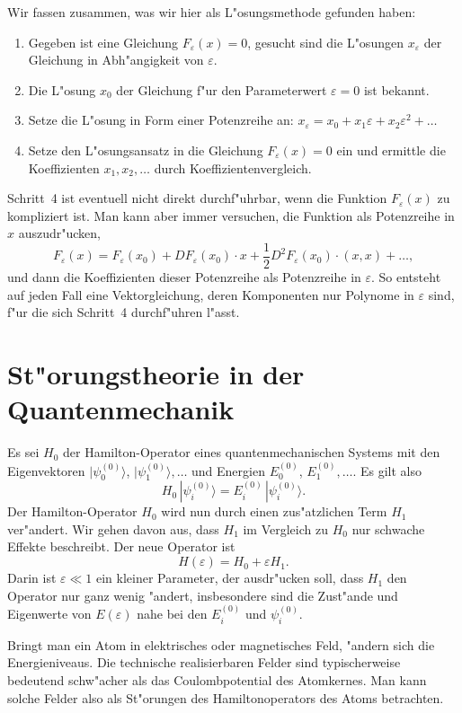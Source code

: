 Wir fassen zusammen, was wir hier als L"osungsmethode gefunden haben:
\begin{enumerate}
\item Gegeben ist eine Gleichung $F_\varepsilon(x)=0$, gesucht
sind die L"osungen $x_\varepsilon$ der Gleichung in Abh"angigkeit von
$\varepsilon$.
\item Die L"osung $x_0$ der Gleichung f"ur den Parameterwert $\varepsilon=0$
ist bekannt.
\item Setze die L"osung in Form einer Potenzreihe an:
$x_\varepsilon = x_0+x_1\varepsilon+x_2\varepsilon^2+\dots$
\item Setze den L"osungsansatz in die Gleichung $F_\varepsilon(x)=0$ ein
und ermittle die Koeffizienten $x_1,x_2,\dots$ durch Koeffizientenvergleich.
\end{enumerate}
Schritt~4 ist eventuell nicht direkt durchf"uhrbar, wenn die Funktion
$F_\varepsilon(x)$ zu kompliziert ist. Man kann aber immer versuchen, die
Funktion als Potenzreihe in $x$ auszudr"ucken, 
\[
F_\varepsilon(x)=F_\varepsilon(x_0) + DF_\varepsilon(x_0)\cdot x
+ \frac12 D^2F_\varepsilon(x_0)\cdot(x,x)+\dots,
\]
und dann die Koeffizienten dieser Potenzreihe als Potenzreihe in $\varepsilon$.
So entsteht auf jeden Fall eine Vektorgleichung, deren Komponenten nur
Polynome in $\varepsilon$ sind, f"ur die sich Schritt~4 durchf"uhren l"asst.

\section{St"orungstheorie in der Quantenmechanik}
Es sei $H_0$ der Hamilton-Operator eines quantenmechanischen Systems
mit den Eigenvektoren $|\psi_0^{(0)}\rangle$, $|\psi_1^{(0)}\rangle,\dots$
und Energien
$E_0^{(0)}$, $E_1^{(0)},\dots$.
Es gilt also 
\[
H_0\,|\psi_i^{(0)}\rangle = E_i^{(0)}\,|\psi_i^{(0)}\rangle.
\]
Der Hamilton-Operator $H_0$ wird nun durch einen zus"atzlichen Term
$H_1$ ver"andert. Wir gehen davon aus, dass $H_1$ im Vergleich zu
$H_0$ nur schwache Effekte beschreibt. Der neue Operator ist
\[
H(\varepsilon)=H_0+\varepsilon H_1.
\]
Darin ist $\varepsilon\ll 1$ ein kleiner Parameter, der ausdr"ucken
soll, dass $H_1$ den Operator nur ganz wenig "andert, insbesondere
sind die Zust"ande und Eigenwerte von $E(\varepsilon)$ nahe bei 
den $E_i^{(0)}$ und $\psi_i^{(0)}$.

Bringt man ein Atom in elektrisches oder magnetisches Feld, "andern
sich die Energieniveaus.
Die technische realisierbaren Felder sind typischerweise bedeutend
schw"acher als das Coulombpotential des Atomkernes.
Man kann solche Felder also als St"orungen des Hamiltonoperators
des Atoms betrachten.

